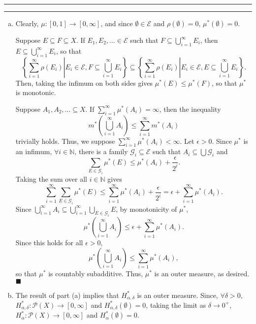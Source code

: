 \documentclass[11pt]{article}
\newcounter{questionCounter}
\newcounter{partCounter}[questionCounter]
\newenvironment{question}[2][\arabic{questionCounter}]{%
    \setcounter{partCounter}{0}%
    \vspace{.25in} \hrule \vspace{0.5em}%
        \noindent{\bf #2}%
    \vspace{0.8em} \hrule \vspace{.10in}%
    \addtocounter{questionCounter}{1}%
}{}
\renewcommand{\qed}{\quad $\blacksquare$}
\begin{document}
\begin{question}{Problem 4}
\begin{enumerate}[(a)]
\item Clearly, $\mu: [0,1] \rightarrow [0,\infty]$, and since
$\emptyset \in \mathcal{E}$ and $\rho(\emptyset) = 0$, $\mu^*(\emptyset) = 0$.

Suppose $E \subseteq F \subseteq X$. If $E_1,E_2,\ldots \in \mathcal{E}$ such
that $F \subseteq \bigcup_{i = 1}^{\infty} E_i$, then
$E \subseteq \bigcup_{i = 1}^{\infty} E_i$, so that
\[\left\{
    \sum_{i = 1}^{\infty} \rho(E_i) \right|\left. E_i \in \mathcal{E},
        F \subseteq \bigcup_{i = 1}^{\infty} E_i
  \right\}
 \subseteq
 \left\{
    \sum_{i = 1}^{\infty} \rho(E_i) \right|\left. E_i \in \mathcal{E},
        E \subseteq \bigcup_{i = 1}^{\infty} E_i
 \right\}.
\]
Then, taking the infimum on both sides gives $\mu^*(E) \leq \mu^*(F)$, so that
$\mu^*$ is monotonic.

Suppose $A_1,A_2,\ldots \subseteq X$. If
$\sum_{i = 1}^{\infty} \mu^*(A_i) = \infty$, then the inequality
\[m^*\left(\bigcup_{i = 1}^{\infty} A_i\right)
 \leq \sum_{i = 1}^{\infty}m^*(A_i)\]
trivially holds. Thus, we suppose $\sum_{i = 1}^{\infty} \mu^*(A_i) < \infty$.
Let $\epsilon > 0$. Since $\mu^*$ is an infimum, $\forall i \in \mathbb{N}$,
there is a family $\mathcal{G}_i \subseteq \mathcal{E}$ such that
$A_i \subseteq \bigcup \mathcal{G}_i$ and
\[\sum_{E \in \mathcal{G}_i} \mu^*(E)
 \leq \mu^*(A_i) + \frac{\epsilon}{2^i}.\]
Taking the sum over all $i \in \mathbb{N}$ gives
\[\sum_{i = 1}^{\infty} \sum_{E \in \mathcal{G}_i} \mu^*(E)
 \leq \sum_{i = 1}^{\infty} \mu^*(A_i) + \frac{\epsilon}{2^i}
 = \epsilon + \sum_{i = 1}^{\infty} \mu^*(A_i).\]
Since
$\displaystyle \bigcup_{i = 1}^{\infty} A_i
 \subseteq \bigcup_{i = 1}^{\infty} \bigcup_{E \in \mathcal{G}_i} E$, by
monotonicity of $\mu^*$,
\[\mu^*\left(\bigcup_{i = 1}^{\infty} A_i\right)
  \leq \epsilon + \sum_{i = 1}^{\infty} \mu^*(A_i).\]
Since this holds for all $\epsilon > 0$,
\[\mu^*\left(\bigcup_{i = 1}^{\infty} A_i\right)
  \leq \sum_{i = 1}^{\infty} \mu^*(A_i),\]
so that $\mu^*$ is countably subadditive. Thus, $\mu^*$ is an outer measure,
as desired. \qed

\item
The result of part (a) implies that $H^*_{\alpha,\delta}$ is an outer
measure. Since, $\forall \delta > 0$,
$H^*_{\alpha,\delta}: \mathcal{P}(X) \rightarrow [0,\infty]$ and
$H^*_{\alpha,\delta}(\emptyset) = 0$, taking the limit as
$\delta \rightarrow 0^+$,
$H^*_{\alpha}: \mathcal{P}(X) \rightarrow [0,\infty]$ and
$H^*_{\alpha}(\emptyset) = 0$.


\end{enumerate}
\end{question}
\end{document}

